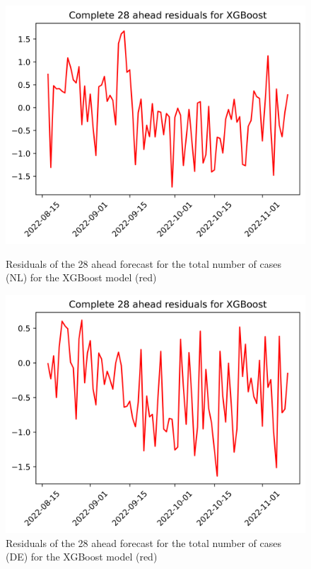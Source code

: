 \begin{figure}

\begin{minipage}{.45\textwidth}
  \centering
  \includegraphics[width=\linewidth]{pics/28_ah/28_ahead_errors_XGBoost.png}
  \caption{Residuals of the 28 ahead forecast for the total number of cases (NL) for the XGBoost model (red)}
  \label{fig:tot_cases_error_28_xgb}
\end{minipage}
\begin{minipage}{.45\textwidth}
  \centering
  \includegraphics[width=\linewidth]{pics/28_ah/DE_28_ahead_errors_XGBoost.png}
  \caption{Residuals of the 28 ahead forecast for the total number of cases (DE) for the XGBoost model (red)}
  \label{fig:tot_cases_error_28_xgb_DE}
\end{minipage}

\end{figure}
